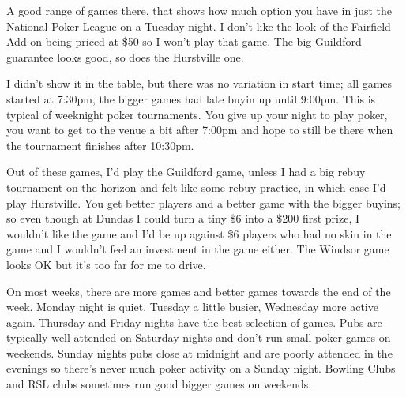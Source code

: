 A good range of games there, that shows how much option you
have in just the National Poker League on a Tuesday night.
I don't like the look of the Fairfield Add-on being priced at \$50
so I won't play that game. The big Guildford guarantee looks
good, so does the Hurstville one.

I didn't show it in the table, but there was no variation in start
time; all games started at 7:30pm, the bigger games had late buyin
up until 9:00pm. This is typical of weeknight poker
tournaments. You give up your night to play poker,
you want to get to the venue a bit after 7:00pm and hope to still
be there when the tournament finishes after 10:30pm.

Out of these games, I'd play the Guildford game, unless I had a big
rebuy tournament on the horizon and felt like some rebuy practice, in
which case I'd play Hurstville. You get better players and a better
game with the bigger buyins; so even though at Dundas I could turn a
tiny \$6 into a \$200 first prize, I wouldn't like the game and I'd be
up against \$6 players who had no skin in the game
and I wouldn't feel an investment in the game either. The Windsor game
looks OK but it's too far for me to drive.

On most weeks, there are more games and better games towards the end
of the week. Monday night is quiet, Tuesday a little busier, Wednesday
more active again. Thursday and Friday nights have the best selection
of games. Pubs are typically well attended on Saturday nights and
don't run small poker games on weekends. Sunday nights pubs close at
midnight and are poorly attended in the evenings so there's never much
poker activity on a Sunday night. Bowling Clubs and RSL clubs
sometimes run good bigger games on weekends.




